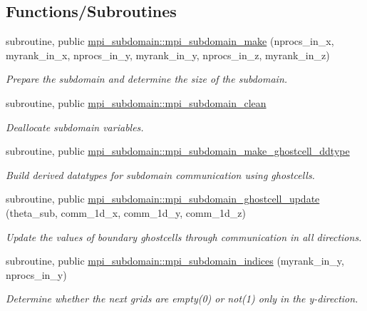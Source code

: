 \subsection*{Functions/\+Subroutines}
\begin{DoxyCompactItemize}
\item 
subroutine, public \hyperlink{namespacempi__subdomain_a3a1e7cf64aafbebd3c09b92fc56bd311}{mpi\+\_\+subdomain\+::mpi\+\_\+subdomain\+\_\+make} (nprocs\+\_\+in\+\_\+x, myrank\+\_\+in\+\_\+x, nprocs\+\_\+in\+\_\+y, myrank\+\_\+in\+\_\+y, nprocs\+\_\+in\+\_\+z, myrank\+\_\+in\+\_\+z)
\begin{DoxyCompactList}\small\item\em Prepare the subdomain and determine the size of the subdomain. \end{DoxyCompactList}\item 
subroutine, public \hyperlink{namespacempi__subdomain_a56e9f2afd59e45fcada0f1c21a90eefe}{mpi\+\_\+subdomain\+::mpi\+\_\+subdomain\+\_\+clean}
\begin{DoxyCompactList}\small\item\em Deallocate subdomain variables. \end{DoxyCompactList}\item 
subroutine, public \hyperlink{namespacempi__subdomain_ad788c273d92ea7058caf0874bffdad6d}{mpi\+\_\+subdomain\+::mpi\+\_\+subdomain\+\_\+make\+\_\+ghostcell\+\_\+ddtype}
\begin{DoxyCompactList}\small\item\em Build derived datatypes for subdomain communication using ghostcells. \end{DoxyCompactList}\item 
subroutine, public \hyperlink{namespacempi__subdomain_a2e34a77537009dd448375e8fdc8d5b62}{mpi\+\_\+subdomain\+::mpi\+\_\+subdomain\+\_\+ghostcell\+\_\+update} (theta\+\_\+sub, comm\+\_\+1d\+\_\+x, comm\+\_\+1d\+\_\+y, comm\+\_\+1d\+\_\+z)
\begin{DoxyCompactList}\small\item\em Update the values of boundary ghostcells through communication in all directions. \end{DoxyCompactList}\item 
subroutine, public \hyperlink{namespacempi__subdomain_afe948dc18da021f2448cf9a6265155fe}{mpi\+\_\+subdomain\+::mpi\+\_\+subdomain\+\_\+indices} (myrank\+\_\+in\+\_\+y, nprocs\+\_\+in\+\_\+y)
\begin{DoxyCompactList}\small\item\em Determine whether the next grids are empty(0) or not(1) only in the y-\/direction. \end{DoxyCompactList}\item 

\end{DoxyCompactItemize}
